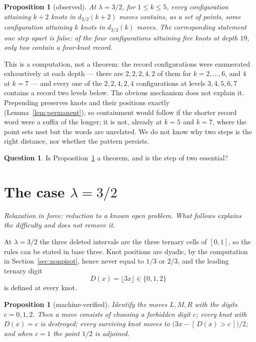 \documentclass[11pt,reqno]{amsart}
\theoremstyle{plain}
\newtheorem{proposition}[theorem]{Proposition}
\theoremstyle{definition}
\newtheorem{question}[theorem]{Question}
\theoremstyle{remark}
\begin{document}
\begin{proposition}[observed]\label{prop:twostep}
At $\lambda=3/2$, for $1\leq k\leq5$, every configuration attaining $k+2$
knots in $d_{3/2}(k+2)$ moves contains, as a set of points, some
configuration attaining $k$ knots in $d_{3/2}(k)$ moves. The corresponding
statement one step apart is false: of the four configurations attaining five
knots at depth $19$, only two contain a four-knot record.
\end{proposition}

This is a computation, not a theorem: the record configurations were
enumerated exhaustively at each depth --- there are $2,2,2,4,2$ of them for
$k=2,\dots,6$, and $4$ at $k=7$ --- and every one of the $2,2,4,2,4$
configurations at levels $3,4,5,6,7$ contains a record two levels below. The
obvious mechanism does not explain it. Prepending preserves knots and their
positions exactly (Lemma~\ref{lem:permanent}), so containment would follow if
the shorter record word were a suffix of the longer; it is not, already at
$k=5$ and $k=7$, where the point sets nest but the words are unrelated. We do
not know why two steps is the right distance, nor whether the pattern persists.

\begin{question}
Is Proposition~\ref{prop:twostep} a theorem, and is the step of two essential?
\end{question}

\section{\texorpdfstring{The case $\lambda=3/2$}{The case lambda = 3/2}}\label{sec:threehalves}

\emph{Relaxation in force: reduction to a known open problem. What follows
explains the difficulty and does not remove it.}

At $\lambda=3/2$ the three deleted intervals are the three ternary cells of
$[0,1]$, so the rules can be stated in base three. Knot positions are dyadic, by
the computation in Section~\ref{sec:nonpisot}, hence never equal to $1/3$ or
$2/3$, and the leading ternary digit
\[
  D(x)=\lfloor 3x\rfloor\in\{0,1,2\}
\]
is defined at every knot.

\begin{proposition}[machine-verified]\label{prop:ternary}
Identify the moves $L,M,R$ with the digits $c=0,1,2$. Then a move consists of
choosing a forbidden digit $c$; every knot with $D(x)=c$ is destroyed; every
surviving knot moves to $\bigl(3x-[\,D(x)>c\,]\bigr)/2$; and when $c=1$ the
point $1/2$ is adjoined.
\end{proposition}
\end{document}
